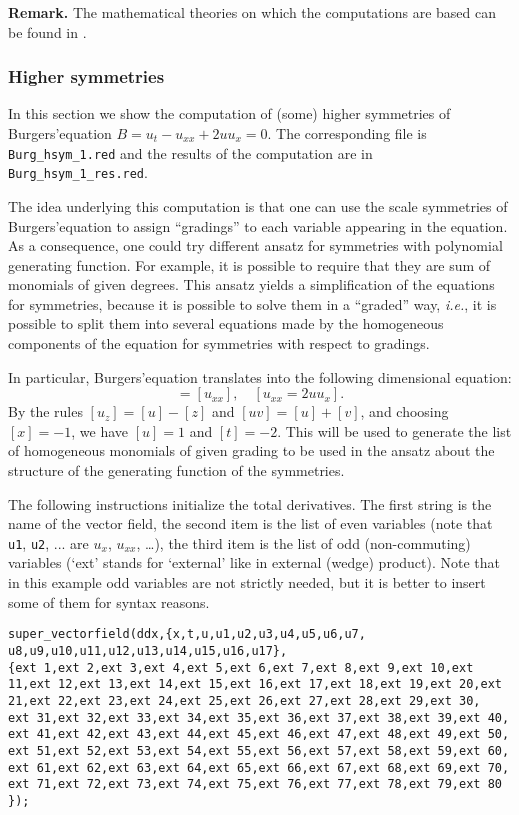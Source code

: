 \textbf{Remark.} The mathematical theories on which the computations are based
can be found in \cite{Many,KKV}.

\subsubsection{Higher symmetries}\label{sec:higher-symmetries}

In this section we show the computation of (some) higher symmetries of
Burgers'equation $B=u_t-u_{xx}+2uu_x=0$. The corresponding file is
\texttt{Burg\_hsym\_1.red} and the results of the computation are in
\texttt{Burg\_hsym\_1\_res.red}.

The idea underlying this computation is that one can use the scale symmetries
of Burgers'equation to assign ``gradings'' to each variable appearing in the
equation. As a consequence, one could try different ansatz for symmetries with
polynomial generating function. For example, it is possible to require that
they are sum of monomials of given degrees. This ansatz yields a simplification
of the equations for symmetries, because it is possible to solve them in a
``graded'' way, \emph{i.e.}, it is possible to split them into several
equations made by the homogeneous components of the equation for symmetries
with respect to gradings.

In particular, Burgers'equation translates into the following dimensional
equation:
\begin{displaymath}
  [u_t]=[u_{xx}],\quad [u_{xx}=2uu_x].
\end{displaymath}
By the rules $[u_z]=[u]-[z]$ and $[uv]=[u]+[v]$, and choosing $[x]=-1$, we have
$[u]=1$ and $[t]=-2$. This will be used to generate the list of homogeneous
monomials of given grading to be used in the ansatz about the structure of the
generating function of the symmetries.

The following instructions initialize the total derivatives. The first string
is the name of the vector field, the second item is the list of even variables
(note that \texttt{u1}, \texttt{u2}, ... are $u_x$, $u_{xx}$, \dots), the third
item is the list of odd (non-commuting) variables (`ext' stands for `external'
like in external (wedge) product). Note that in this example odd variables are
not strictly needed, but it is better to insert some of them for syntax reasons.
\begin{verbatim}
super_vectorfield(ddx,{x,t,u,u1,u2,u3,u4,u5,u6,u7,
u8,u9,u10,u11,u12,u13,u14,u15,u16,u17},
{ext 1,ext 2,ext 3,ext 4,ext 5,ext 6,ext 7,ext 8,ext 9,ext 10,ext
11,ext 12,ext 13,ext 14,ext 15,ext 16,ext 17,ext 18,ext 19,ext 20,ext
21,ext 22,ext 23,ext 24,ext 25,ext 26,ext 27,ext 28,ext 29,ext 30,
ext 31,ext 32,ext 33,ext 34,ext 35,ext 36,ext 37,ext 38,ext 39,ext 40,
ext 41,ext 42,ext 43,ext 44,ext 45,ext 46,ext 47,ext 48,ext 49,ext 50,
ext 51,ext 52,ext 53,ext 54,ext 55,ext 56,ext 57,ext 58,ext 59,ext 60,
ext 61,ext 62,ext 63,ext 64,ext 65,ext 66,ext 67,ext 68,ext 69,ext 70,
ext 71,ext 72,ext 73,ext 74,ext 75,ext 76,ext 77,ext 78,ext 79,ext 80
});
\end{verbatim}

